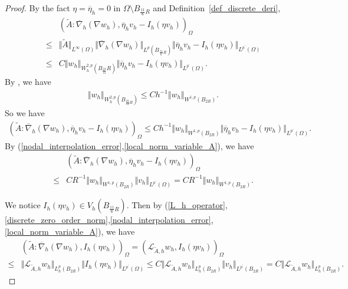 \documentclass[12pt]{amsart}
\theoremstyle{definition}
\theoremstyle{remark}
\begin{document}
\begin{proof}
By the fact $\eta = \overline{\eta}_{h} = 0$ in $\Omega \setminus B_{\frac{11}{6}R}$ and Definition~\ref{def_discrete_deri},
\begin{align*}
& (\tilde{A}:\overline{\nabla}_{h}( \nabla  w_{h}), \overline{\eta}_{h} v_{h} - I_{h}(\eta v_{h}))_{\Omega} \\
\leq & \Vert \tilde{A} \Vert_{L^{\infty}(\Omega)} \Vert \overline{\nabla}_{h}( \nabla  w_{h}) \Vert_{L^{p}(B_{\frac{11}{6}R})} 
\Vert \overline{\eta}_{h} v_{h} - I_{h}(\eta v_{h}) \Vert_{L^{p^{\prime}}(\Omega)} \\
\leq & C \Vert w_{h}\Vert_{W_{h}^{2,p}(B_{\frac{23}{12}}R)}
\Vert \overline{\eta}_{h} v_{h} - I_{h}(\eta v_{h}) \Vert_{L^{p^{\prime}}(\Omega)}.
\end{align*}
By \cite[Lemma~$2.2$]{FHM2017}, we have 
\begin{align*}
\Vert w_{h} \Vert_{W_{h}^{2,p}(B_{\frac{23}{12} R})} \leq Ch^{-1} \Vert w_{h}\Vert_{W^{1,p}(B_{2R})}.
\end{align*}
So we have 
\begin{align*}
(\tilde{A}:\overline{\nabla}_{h}( \nabla  w_{h}), \overline{\eta}_{h} v_{h} - I_{h}(\eta v_{h}))_{\Omega} 
\leq C h^{-1}\Vert w_{h}\Vert_{W^{1,p}(B_{2R})} 
\Vert \overline{\eta}_{h} v_{h} - I_{h}(\eta v_{h}) \Vert_{L^{p^{\prime}}(\Omega)}.
\end{align*}
By (\ref{nodal_interpolation_error},\ref{local_norm_variable_A}), we have 
\begin{align}
\label{gloabl_estimate_with_reaction_ineq8} 
& (\tilde{A}:\overline{\nabla}_{h}( \nabla  w_{h}), \overline{\eta}_{h} v_{h} - I_{h}(\eta v_{h}))_{\Omega} \\
\nonumber
\leq & C R^{-1} \Vert w_{h}\Vert_{W^{1,p}(B_{2R})} \Vert v_{h} \Vert_{L^{p^{\prime}}(\Omega)} 
= C R^{-1} \Vert w_{h}\Vert_{W^{1,p}(B_{2R})}.
\end{align}

We notice $I_{h}(\eta v_{h}) \in V_{h}(B_{\frac{11}{6}R})$. Then by 
(\ref{L_h_operator},\ref{discrete_zero_order_norm},\ref{nodal_interpolation_error},\ref{local_norm_variable_A}), 
we have 
\begin{align}
\label{gloabl_estimate_with_reaction_ineq9}
& (\tilde{A}:\overline{\nabla}_{h}( \nabla  w_{h}), I_{h}(\eta v_{h}))_{\Omega} 
= (\mathcal{L}_{\tilde{A},h}w_{h}, I_{h}(\eta v_{h}))_{\Omega} \\
\nonumber
\leq & \Vert \mathcal{L}_{\tilde{A},h}w_{h}\Vert_{L_{h}^{p}(B_{2R})} 
\Vert I_{h}(\eta v_{h})\Vert_{L^{p^{\prime}}(\Omega)}
\leq C \Vert \mathcal{L}_{\tilde{A},h}w_{h}\Vert_{L_{h}^{p}(B_{2R})} \Vert v_{h} \Vert_{L^{p^{\prime}}(B_{2R})}
= C \Vert \mathcal{L}_{\tilde{A},h}w_{h}\Vert_{L_{h}^{p}(B_{2R})}.
\end{align}


\end{proof}
\end{document}
